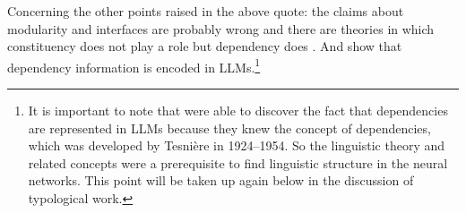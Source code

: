 Concerning the other points raised in the above quote: the claims about modularity and interfaces are probably
wrong \parencites{Pulvermueller1999a-u,PCS2013a-u}[, 27]{Jackendoff2000a}{Kuhn2007a} and there are theories in which constituency does not play
a role but dependency does \citep{Tesniere59a-Eng}. And \citet{ClarkKhandelwalLevaManning2019a,HewittManning2019a,ManningClarkHewitt2020a} show that
dependency information is encoded in LLMs.\footnote{\label{fn-dependencies}%
  It is important to note that \citet{ClarkKhandelwalLevaManning2019a,HewittManning2019a,ManningClarkHewitt2020a} were able to discover the fact that
  dependencies are represented in LLMs because they knew the concept of dependencies, which was
  developed by Tesnière in 1924--1954. So the linguistic theory and related concepts were a prerequisite
  to find linguistic structure in the neural networks. This point will be taken up again
  below in the discussion of typological work.
%
}


